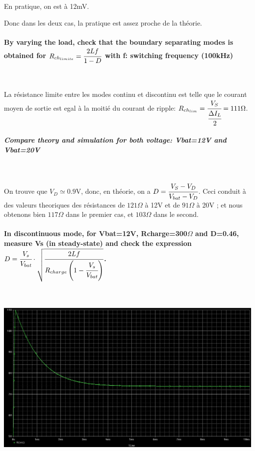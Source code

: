 \documentclass{article}
\begin{document}
En pratique, on est à 12mV.

Donc dans les deux cas, la pratique est assez proche de la théorie.

\paragraph{By varying the load, check that the boundary separating modes is obtained for $R_{ch_{limite}} = \cfrac{2Lf}{1-D}$ with f: switching frequency (100kHz)}

~

La résistance limite entre les modes continu et discontinu est telle que le courant moyen de sortie est egal à la moitié du courant de ripple:
$R_{ch_{lim}} = \cfrac{V_S}{\cfrac{\Delta I_L}{2}} = 111\Omega$.

\subparagraph{Compare theory and simulation for both voltage: Vbat=12V and Vbat=20V}

~

On trouve que $V_D \simeq 0.9$V, donc, en théorie, on a $D = \cfrac{V_S-V_D}{V_{bat}-V_D}$.
Ceci conduit à des valeurs theoriques des résistances de $121 \Omega$ à 12V et de $91 \Omega$ à 20V ; et nous obtenons bien $117\Omega$ dans le premier cas, et $103\Omega$ dans le second.


\paragraph{In discontinuous mode, for Vbat=12V, Rcharge=300$\Omega$ and D=0.46, measure Vs (in steady-state) and check the expression
    $D=\cfrac{V_s}{V_{bat}}\cdot\sqrt{\cfrac{2Lf}{R_{charge}\left(1-\cfrac{V_s}{V_{bat}}\right)}}$.}

~

\includegraphics[width=\linewidth]{discontinuous.png}
\end{document}
